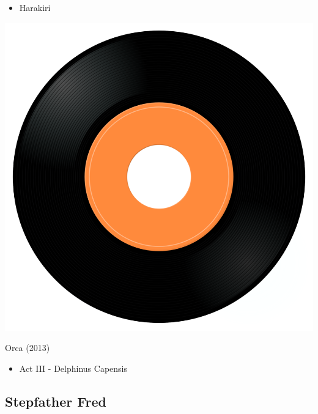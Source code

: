 \begin{minipage}[t]{0.25\textwidth}\vspace{0pt}
\begin{itemize}[nosep,leftmargin=1em,labelwidth=*,align=left]
	\setlength{\itemsep}{0pt}
	\item Harakiri
\end{itemize}
\end{minipage}
\begin{minipage}[t]{0.25\textwidth}
\captionsetup{type=figure}
\includegraphics[width=\textwidth]{Images/cover.png}
\caption*{Orca (2013)}
\end{minipage}
\begin{minipage}[t]{0.25\textwidth}\vspace{0pt}
\begin{itemize}[nosep,leftmargin=1em,labelwidth=*,align=left]
	\setlength{\itemsep}{0pt}
	\item Act III - Delphinus Capensis
\end{itemize}
\end{minipage}

\subsection{Stepfather Fred}

